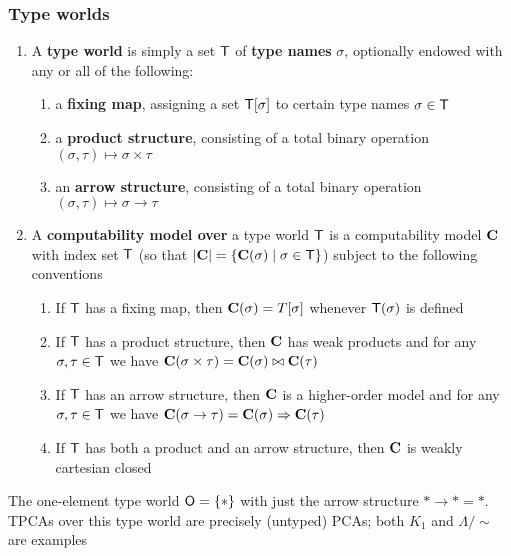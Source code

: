 \documentclass[11pt]{article}
\begin{document}
\subsubsection{Type worlds}
\label{sec:orgbae8f17}
\begin{definition}[]
\begin{enumerate}
\item A \textbf{type world} is simply a set \(\textsf{T}\) of \textbf{type names} \(\sigma\), optionally endowed with any or
all of the following:
\begin{enumerate}
\item a \textbf{fixing map}, assigning a set \(\textsf{T}[\sigma]\) to certain type names \(\sigma\in\textsf{T}\)
\item a \textbf{product structure}, consisting of a total binary operation \((\sigma,\tau)\mapsto\sigma\times\tau\)
\item an \textbf{arrow structure}, consisting of a total binary operation \((\sigma,\tau)\mapsto\sigma\to\tau\)
\end{enumerate}
\item A \textbf{computability model over} a type world \(\textsf{T}\) is a computability model \(\operatorname{\textbf{C}}\) with index
set \(\textsf{T}\) (so that \(\abs{\bC}=\{\bC(\sigma)\mid\sigma\in\sfT\}\)) subject to the following conventions
\begin{enumerate}
\item If \(\textsf{T}\) has a fixing map, then \(\operatorname{\textbf{C}}(\sigma)=T[\sigma]\) whenever \(\textsf{T}(\sigma)\) is defined
\item If \(\textsf{T}\) has a product structure, then \(\operatorname{\textbf{C}}\) has weak products and for any \(\sigma,\tau\in\textsf{T}\)
we have \(\operatorname{\textbf{C}}(\sigma\times\tau)=\operatorname{\textbf{C}}(\sigma)\bowtie\operatorname{\textbf{C}}(\tau)\)
\item If \(\textsf{T}\) has an arrow structure, then \(\operatorname{\textbf{C}}\) is a higher-order model and for
any \(\sigma,\tau\in\textsf{T}\) we have \(\operatorname{\textbf{C}}(\sigma\to\tau)=\operatorname{\textbf{C}}(\sigma)\Rightarrow\operatorname{\textbf{C}}(\tau)\)
\item If \(\textsf{T}\) has both a product and an arrow structure, then \(\operatorname{\textbf{C}}\) is weakly cartesian closed
\end{enumerate}
\end{enumerate}
\end{definition}

\begin{examplle}[]
The one-element type world \(\textsf{O}=\{*\}\) with just the arrow structure \(*\to*=*\). TPCAs over this
type world are precisely (untyped) PCAs; both \(K_1\) and \(\Lambda/\sim\) are examples
\end{examplle}
\end{document}
